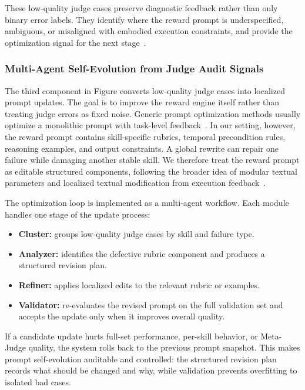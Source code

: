 These low-quality judge cases preserve diagnostic feedback rather than only binary error labels. They identify where the reward prompt is underspecified, ambiguous, or misaligned with embodied execution constraints, and provide the optimization signal for the next stage~\citep{li2025multiagent}.

\subsubsection{Multi-Agent Self-Evolution from Judge Audit Signals}
\label{subsec:structured_reward_optimization}

The third component in Figure converts low-quality judge cases into localized prompt updates. The goal is to improve the reward engine itself rather than treating judge errors as fixed noise. Generic prompt optimization methods usually optimize a monolithic prompt with task-level feedback~\citep{yang2024opro,khattab2023dspy}. In our setting, however, the reward prompt contains skill-specific rubrics, temporal precondition rules, reasoning examples, and output constraints. A global rewrite can repair one failure while damaging another stable skill. We therefore treat the reward prompt as editable structured components, following the broader idea of modular textual parameters and localized textual modification from execution feedback~\citep{he2026learning}.

The optimization loop is implemented as a multi-agent workflow. Each module handles one stage of the update process:
\begin{itemize}
    \item \textbf{Cluster:} groups low-quality judge cases by skill and failure type.
    \item \textbf{Analyzer:} identifies the defective rubric component and produces a structured revision plan.
    \item \textbf{Refiner:} applies localized edits to the relevant rubric or examples.
    \item \textbf{Validator:} re-evaluates the revised prompt on the full validation set and accepts the update only when it improves overall quality.
\end{itemize}

If a candidate update hurts full-set performance, per-skill behavior, or Meta-Judge quality, the system rolls back to the previous prompt snapshot. This makes prompt self-evolution auditable and controlled: the structured revision plan records what should be changed and why, while validation prevents overfitting to isolated bad cases.

